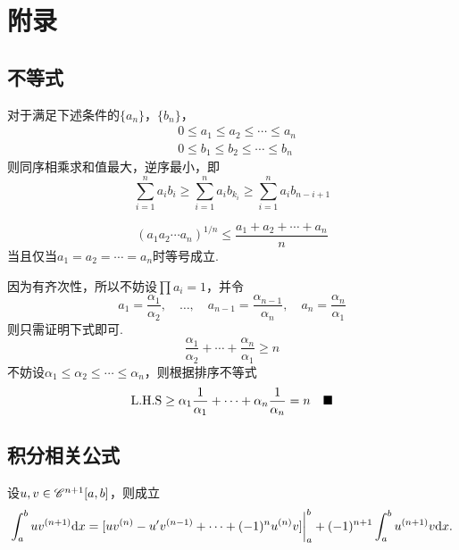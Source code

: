 \newpage
\section{附录}
\subsection{不等式}

  \begin{lemma}[排序不等式]
    \label{lemma: 排序不等式}
    对于满足下述条件的$\{a_n\}$，$\{b_n\}$，
    \[\begin{split}
      & 0 \le a_1\le a_2\le\cdots\le a_n \\
      & 0 \le b_1\le b_2\le\cdots\le b_n
    \end{split}\]
    则同序相乘求和值最大，逆序最小，即
    \[
      \sum_{i=1}^n a_ib_i \ge \sum_{i=1}^n a_ib_{k_i}
      \ge \sum_{i=1}^n a_ib_{n-i+1}
    \]
  \end{lemma}

  \begin{lemma}[算数-几何均值不等式]
    \[
      (a_1a_2\cdots a_n)^{1/n} \le \frac{a_1+a_2+\cdots+a_n}{n}
    \]
    当且仅当$a_1 = a_2 = \cdots = a_n$时等号成立.
  \end{lemma}
  \proof
    因为有齐次性，所以不妨设$\prod a_i=1$，并令
    \[
      a_1=\frac{\alpha_1}{\alpha_2},\quad
      \dots,\quad
      a_{n-1} = \frac{\alpha_{n-1}}{\alpha_n},\quad
      a_n = \frac{\alpha_n}{\alpha_1}
    \]
    则只需证明下式即可.
    \[
      \frac{\alpha_1}{\alpha_2} + \cdots + \frac{\alpha_n}{\alpha_1}
      \ge n
    \]
    不妨设$\alpha_1 \le \alpha_2 \le \cdots \le \alpha_n$，则根据排序不等式
    \[
      \text{L.H.S} \ge \alpha_1\frac{1}{\alpha_1} + \cdots + \alpha_n\frac{1}{\alpha_n}
       = n \quad\blacksquare
    \]

\newpage
\subsection{积分相关公式}
  \begin{lemma}[分部积分]
    设$u,v\in\mathscr{C}^{n+1}[a, b]$，则成立
    \[
      \int_a^buv^{(n+1)}\mathrm{d} x =
      [ uv^{(n)} - u^\prime v^{(n-1)} + \cdots +  (-1)^nu^{(n)}v]
      \bigg\vert_a^b + (-1)^{n+1}\int_a^bu^{(n+1)}v\mathrm{d} x.
    \]
  \end{lemma}

\newpage



